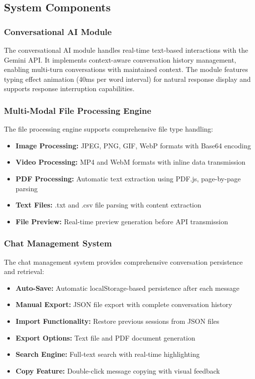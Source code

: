 \documentclass[conference]{IEEEtran}
\begin{document}
\subsection{System Components}

\subsubsection{Conversational AI Module}
The conversational AI module handles real-time text-based interactions with the Gemini API. It implements context-aware conversation history management, enabling multi-turn conversations with maintained context. The module features typing effect animation (40ms per word interval) for natural response display and supports response interruption capabilities.

\subsubsection{Multi-Modal File Processing Engine}
The file processing engine supports comprehensive file type handling:
\begin{itemize}[itemsep=0pt, parsep=0pt, leftmargin=*]
    \item \textbf{Image Processing:} JPEG, PNG, GIF, WebP formats with Base64 encoding
    \item \textbf{Video Processing:} MP4 and WebM formats with inline data transmission
    \item \textbf{PDF Processing:} Automatic text extraction using PDF.js, page-by-page parsing
    \item \textbf{Text Files:} .txt and .csv file parsing with content extraction
    \item \textbf{File Preview:} Real-time preview generation before API transmission
\end{itemize}

\subsubsection{Chat Management System}
The chat management system provides comprehensive conversation persistence and retrieval:
\begin{itemize}[itemsep=0pt, parsep=0pt, leftmargin=*]
    \item \textbf{Auto-Save:} Automatic localStorage-based persistence after each message
    \item \textbf{Manual Export:} JSON file export with complete conversation history
    \item \textbf{Import Functionality:} Restore previous sessions from JSON files
    \item \textbf{Export Options:} Text file and PDF document generation
    \item \textbf{Search Engine:} Full-text search with real-time highlighting
    \item \textbf{Copy Feature:} Double-click message copying with visual feedback
\end{itemize}
\end{document}
